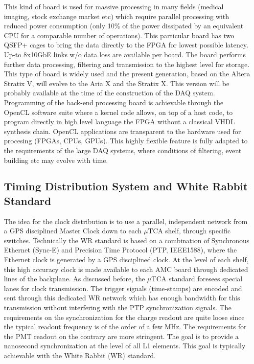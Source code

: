 This kind of board is used for massive processing in many fields
(medical imaging, stock exchange market etc) which require parallel
processing with reduced power consumption (only 10\% of the power
dissipated by an equivalent CPU for a comparable number of
operations). This particular board has two QSFP+ cages to bring the
data directly to the FPGA for lowest possible latency. Up-to 8x10GbE
links w/o data loss are available per board.  The board performs
further data processing, filtering and transmission to the highest
level for storage. This type of board is widely used and the present
generation, based on the Altera Stratix V, will evolve to the Aria X
and the Stratix X. This version will be probably available at the time
of the construction of the DAQ system. Programming of the back-end
processing board is achievable through the OpenCL software suite where
a kernel code allows, on top of a host code, to program directly in
high level language the FPGA without a classical VHDL synthesis
chain. OpenCL applications are transparent to the hardware used for
procesing (FPGAs, CPUs, GPUs). This highly flexible feature is fully
adapted to the requirements of the large DAQ systems, where conditions
of filtering, event building etc may evolve with time.
 
\subsection{Timing Distribution System and White Rabbit Standard}

The idea for the clock distribution is to use a parallel, independent
network from a GPS disciplined Master Clock down to each $\mu$TCA
shelf, through specific switches. Technically the WR standard is based
on a combination of Synchronous Ethernet (Sync-E) and Precision Time
Protocol (PTP, IEEE1588), where the Ethernet clock is generated by a
GPS disciplined clock. At the level of each shelf, this high accuracy
clock is made available to each AMC board through dedicated lines of
the backplane. As discussed before, the $\mu$TCA standard foresees
special lanes for clock transmission. The trigger signals
(time-stamps) are encoded and sent through this dedicated WR network
which has enough bandwidth for this transmission without interfering
with the PTP synchronization signals. The requirements on the
synchronization for the charge readout are quite loose since the
typical readout frequency is of the order of a few MHz. The
requirements for the PMT readout on the contrary are more
stringent. The goal is to provide a nanosecond synchronization at the
level of all L1 elements. This goal is typically achievable with the
White Rabbit (WR) standard\cite{WR-standard}.

